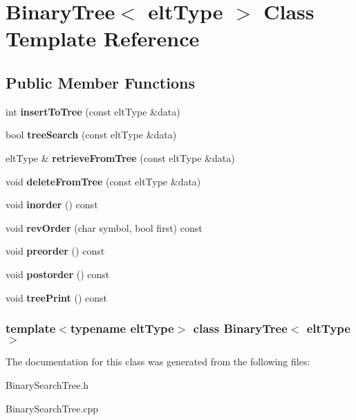 \hypertarget{classBinaryTree}{
\section{BinaryTree$<$ eltType $>$ Class Template Reference}
\label{classBinaryTree}
}
\subsection*{Public Member Functions}
\begin{DoxyCompactItemize}
\item 
\hypertarget{classBinaryTree_a2b81eef96e974b01ce340535a7cab353}{
int {\bfseries insertToTree} (const eltType \&data)}
\label{classBinaryTree_a2b81eef96e974b01ce340535a7cab353}

\item 
\hypertarget{classBinaryTree_a67cf4e7630dd7be6bc986892beea8835}{
bool {\bfseries treeSearch} (const eltType \&data)}
\label{classBinaryTree_a67cf4e7630dd7be6bc986892beea8835}

\item 
\hypertarget{classBinaryTree_ad0a57468737c049c56433773b684e826}{
eltType \& {\bfseries retrieveFromTree} (const eltType \&data)}
\label{classBinaryTree_ad0a57468737c049c56433773b684e826}

\item 
\hypertarget{classBinaryTree_ac55750f02c678c6b1147130e78528276}{
void {\bfseries deleteFromTree} (const eltType \&data)}
\label{classBinaryTree_ac55750f02c678c6b1147130e78528276}

\item 
\hypertarget{classBinaryTree_a2259d8f05d66e5bba8403c49755e3df3}{
void {\bfseries inorder} () const }
\label{classBinaryTree_a2259d8f05d66e5bba8403c49755e3df3}

\item 
\hypertarget{classBinaryTree_aefd2b222e265429c913c6e3760cb4b72}{
void {\bfseries revOrder} (char symbol, bool first) const }
\label{classBinaryTree_aefd2b222e265429c913c6e3760cb4b72}

\item 
\hypertarget{classBinaryTree_a9ebced48d15bca2b17d02f72544c3c2c}{
void {\bfseries preorder} () const }
\label{classBinaryTree_a9ebced48d15bca2b17d02f72544c3c2c}

\item 
\hypertarget{classBinaryTree_ab388d9dfd96d5ec1887fbd8b35287081}{
void {\bfseries postorder} () const }
\label{classBinaryTree_ab388d9dfd96d5ec1887fbd8b35287081}

\item 
\hypertarget{classBinaryTree_a6edf74611ead442a24510837c6a1b741}{
void {\bfseries treePrint} () const }
\label{classBinaryTree_a6edf74611ead442a24510837c6a1b741}

\end{DoxyCompactItemize}
\subsubsection*{template$<$typename eltType$>$ class BinaryTree$<$ eltType $>$}



The documentation for this class was generated from the following files:\begin{DoxyCompactItemize}
\item 
BinarySearchTree.h\item 
BinarySearchTree.cpp\end{DoxyCompactItemize}
